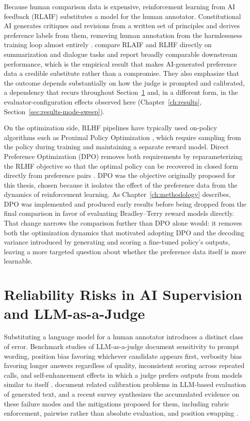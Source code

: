 Because human comparison data is expensive, reinforcement learning from AI feedback
(RLAIF) substitutes a model for the human annotator. Constitutional AI generates
critiques and revisions from a written set of principles and derives preference
labels from them, removing human annotation from the harmlessness training loop
almost entirely \citep{bai2022constitutional}. \citet{lee2023rlaif} compare RLAIF
and RLHF directly on summarization and dialogue tasks and report broadly
comparable downstream performance, which is the empirical result that makes
AI-generated preference data a credible substitute rather than a compromise. They
also emphasize that the outcome depends substantially on how the judge is
prompted and calibrated, a dependency that recurs throughout
Section~\ref{sec:rw-judge-reliability} and, in a different form, in the
evaluator-configuration effects observed here
(Chapter~\ref{ch:results}, Section~\ref{sec:results-mode-sweep}).

On the optimization side, RLHF pipelines have typically used on-policy algorithms
such as Proximal Policy Optimization \citep{schulman2017ppo}, which require
sampling from the policy during training and maintaining a separate reward model.
Direct Preference Optimization (DPO) removes both requirements by reparameterizing
the RLHF objective so that the optimal policy can be recovered in closed form
directly from preference pairs \citep{rafailov2023dpo}. DPO was the objective
originally proposed for this thesis, chosen because it isolates the effect of the
preference data from the dynamics of reinforcement learning. As
Chapter~\ref{ch:methodology} describes, DPO was implemented and produced early
results before being dropped from the final comparison in favor of evaluating
Bradley--Terry reward models directly. That change narrows the comparison further
than DPO alone would: it removes both the optimization dynamics that motivated
adopting DPO and the decoding variance introduced by generating and scoring a
fine-tuned policy's outputs, leaving a more targeted question about whether the
preference data itself is more learnable.

\section{Reliability Risks in AI Supervision and LLM-as-a-Judge}
\label{sec:rw-judge-reliability}

Substituting a language model for a human annotator introduces a distinct class of
error. Benchmark studies of LLM-as-a-judge document sensitivity to prompt wording,
position bias favoring whichever candidate appears first, verbosity bias favoring
longer answers regardless of quality, inconsistent scoring across repeated calls,
and self-enhancement effects in which a judge prefers outputs from models similar
to itself \citep{zheng2023judging}. \citet{liu2023geval} document related
calibration problems in LLM-based evaluation of generated text, and a recent
survey synthesizes the accumulated evidence on these failure modes and the
mitigations proposed for them, including rubric enforcement, pairwise rather than
absolute evaluation, and position swapping \citep{gu2024survey}.

